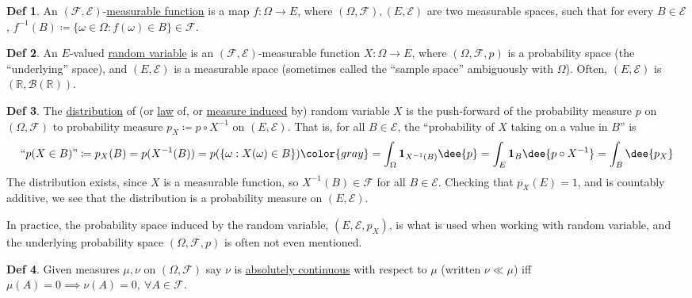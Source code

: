 \documentclass[a4paper]{article}
\theoremstyle{definition}
\newtheorem*{definition}{Def}
\newcommand\gray[1]{{\color{gray}#1}}
\newcommand\key\uline%
\begin{document}
\begin{definition}
  An $(\mathcal{F},\mathcal{E})$-\key{measurable function} is a map $f:\Omega
  \to E$, where $(\Omega,\mathcal{F}),(E,\mathcal{E})$ are two measurable
  spaces, such that for every $B\in\mathcal{E}$,
  $f^{-1}(B)\coloneqq\{\omega\in\Omega:f(\omega)\in B\}\in \mathcal{F}$.
\end{definition}

\begin{definition}
  An $E$-valued \key{random variable} is an
  $(\mathcal{F},\mathcal{E})$-measurable function $X:\Omega \to E$, where
  $(\Omega,\mathcal{F},p)$ is a probability space (the ``underlying'' space),
  and $(E,\mathcal{E})$ is a measurable space (sometimes called the ``sample
  space'' ambiguously with $\Omega$). \gray{Often, $(E,\mathcal{E})$ is
  $(\mathbb{R},\mathcal{B}(\mathbb{R}))$.}
\end{definition}

\begin{definition}
  The \key{distribution} of (or \key{law} of, or
  \key{measure induced} by) random variable $X$ is the
  push-forward of the probability measure $p$ on $(\Omega,\mathcal{F})$ to
  probability measure $p_X \coloneqq p \circ X^{-1}$ on $(E,\mathcal{E})$. That
  is, for all $B\in\mathcal{E}$, the ``probability of $X$ taking on a value in
  $B$'' is
  \begin{equation*}
    \text{``}p(X\in B)\text{''} \coloneqq p_X(B)
    = p(X^{-1}(B)) =  p(\{\omega:X(\omega)\in B\})
    \gray{
      =\int_\Omega \mathbf{1}_{X^{-1}(B)}\dee{p}
      =\int_E\mathbf{1}_B\dee{p\circ X^{-1}}
      =\int_B\dee{p_X}
    }
  \end{equation*}
  The distribution exists, since $X$ is a measurable function, so $X^{-1}( B ) \in
  \mathcal{F}$ for all $B \in \mathcal{E}$.  Checking that $p_X(E)=1$, and is
  countably additive, we see that the distribution is a probability measure on
  $(E, \mathcal{E})$.

  \gray{
    In practice, the probability space induced by the random variable,
    $(E,\mathcal{E},p_X)$, is what is used when working with random variable,
    and the underlying probability space $(\Omega,\mathcal{F},p)$ is often not
    even mentioned.
  }
\end{definition}

\begin{definition}
  Given measures $\mu, \nu$ on $(\Omega, \mathcal{F})$ say $\nu$ is
  \key{absolutely continuous} with respect to $\mu$ (written $\nu \ll \mu$) iff
  $\mu(A)=0\implies\nu(A)=0,\ \forall A\in \mathcal{F}$.
\end{definition}
\end{document}

